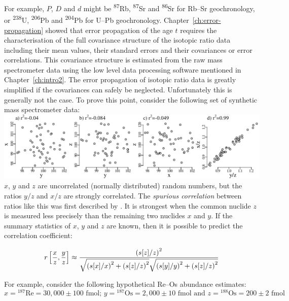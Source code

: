 \begin{refsection}
For example, $P$, $D$ and $d$ might be \textsuperscript{87}Rb,
\textsuperscript{87}Sr and \textsuperscript{86}Sr for Rb--Sr
geochronology, or \textsuperscript{238}U, \textsuperscript{206}Pb and
\textsuperscript{204}Pb for U--Pb
geochronology. Chapter~\ref{ch:error-propagation} showed that error
propagation of the age $t$ requires the characterisation of the full
covariance structure of the isotopic ratio data including their mean
values, their standard errors and their covariances or error
correlations. This covariance structure is estimated from the raw mass
spectrometer data using the low level data processing software
mentioned in Chapter~\ref{ch:intro2}.  The error propagation of
isotopic ratio data is greatly simplified if the covariances can
safely be neglected. Unfortunately this is generally not the case.  To
prove this point, consider the following set of synthetic mass
spectrometer data:\\

\noindent\includegraphics[width=\textwidth]{../figures/spurious}\\

$x$, $y$ and $z$ are uncorrelated (normally distributed) random
numbers, but the ratios $y/z$ and $x/z$ are strongly correlated. The
\emph{spurious correlation} between ratios like this was first
described by \citet{pearson1896}. It is strongest when the common
nuclide $z$ is measured less precisely than the remaining two nuclides
$x$ and $y$. If the summary statistics of $x$, $y$ and $z$ are known,
then it is possible to predict the correlation coefficient:

\begin{equation}
  \noindent r\left[\frac{x}{z},\frac{y}{z}\right] \approx
  \frac{
    \left({s[z]}/{z}\right)^2
  }{
    \sqrt{\left({s[x]}/{x}\right)^2 +
      \left({s[z]}/{z}\right)^2}
    \sqrt{\left({s[y]}/{y}\right)^2 +
      \left({s[z]}/{z}\right)^2}
  }
  \label{eq:spurious-conventional}
\end{equation}

For example, consider the following hypothetical Re--Os abundance
estimates:
\[
x = {}^{187}\mbox{Re} = 30,000 \pm 100 \mbox{~fmol;~}
y = {}^{187}\mbox{Os} = 2,000 \pm 10 \mbox{~fmol}
\mbox{~and~}
z = {}^{188}\mbox{Os} = 200 \pm 2 \mbox{~fmol}
\]


\end{refsection}
